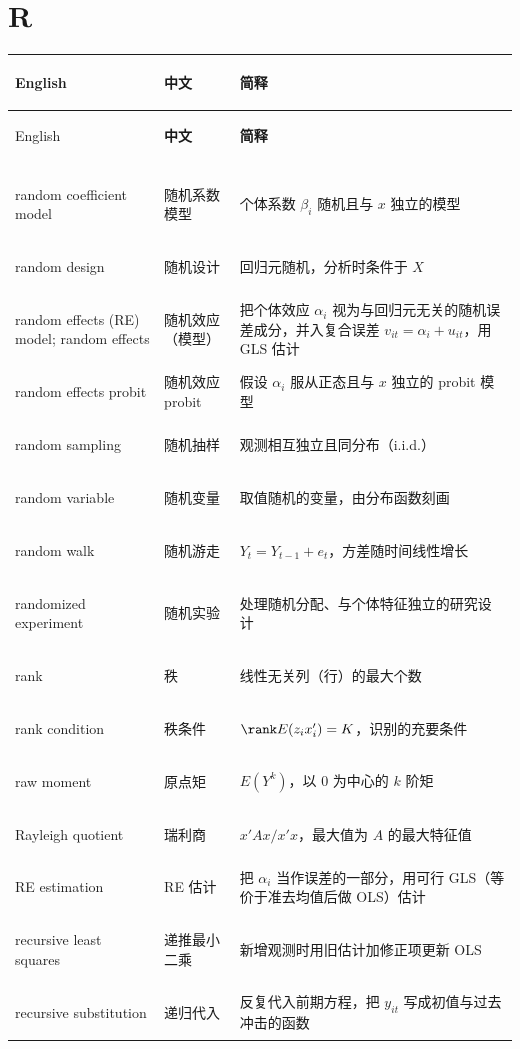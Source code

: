 \section*{R}
\begin{longtable}{@{}>{\bfseries\boldmath\raggedright\arraybackslash}p{4.6cm}>{\raggedright\arraybackslash}p{3.2cm}>{\raggedright\arraybackslash}p{\dimexpr\textwidth-7.8cm-4\tabcolsep\relax}@{}}
\toprule
English & \textbf{中文} & \textbf{简释}\\
\midrule
\endfirsthead
\toprule
English & \textbf{中文} & \textbf{简释}\\
\midrule
\endhead
\midrule
\multicolumn{3}{r@{}}{\footnotesize\itshape （续下页）}\\
\endfoot
\bottomrule
\endlastfoot
random coefficient model & 随机系数模型 & 个体系数 $\beta_i$ 随机且与 $x$ 独立的模型 \\
random design & 随机设计 & 回归元随机，分析时条件于 $X$ \\
random effects (RE) model; random effects & 随机效应（模型） & 把个体效应 $\alpha_i$ 视为与回归元无关的随机误差成分，并入复合误差 $v_{it}=\alpha_i+u_{it}$，用 GLS 估计 \\
random effects probit & 随机效应 probit & 假设 $\alpha_i$ 服从正态且与 $x$ 独立的 probit 模型 \\
random sampling & 随机抽样 & 观测相互独立且同分布（i.i.d.） \\
random variable & 随机变量 & 取值随机的变量，由分布函数刻画 \\
random walk & 随机游走 & $Y_t=Y_{t-1}+e_t$，方差随时间线性增长 \\
randomized experiment & 随机实验 & 处理随机分配、与个体特征独立的研究设计 \\
rank & 秩 & 线性无关列（行）的最大个数 \\
rank condition & 秩条件 & $\rank E(z_ix_i')=K$，识别的充要条件 \\
raw moment & 原点矩 & $E(Y^k)$，以 0 为中心的 $k$ 阶矩 \\
Rayleigh quotient & 瑞利商 & $x'Ax/x'x$，最大值为 $A$ 的最大特征值 \\
RE estimation & RE 估计 & 把 $\alpha_i$ 当作误差的一部分，用可行 GLS（等价于准去均值后做 OLS）估计 \\
recursive least squares & 递推最小二乘 & 新增观测时用旧估计加修正项更新 OLS \\
recursive substitution & 递归代入 & 反复代入前期方程，把 $y_{it}$ 写成初值与过去冲击的函数 \\

\end{longtable}
